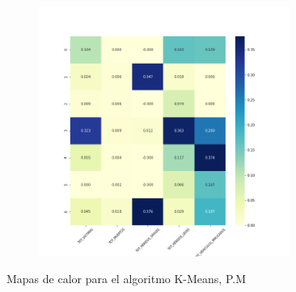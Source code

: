 \begin{figure}[H]
\begin{subfigure}{.5\textwidth}
\end{subfigure}
\begin{subfigure}{.5\textwidth}
  \centering
  \includegraphics[width=0.9\textwidth]{imagenes/case2/kmeans/heatmaps/hm_kmeans_case2_entrada_k7.png}
\end{subfigure}
\caption{Mapas de calor para el algoritmo K-Means, P.M}
\label{fig:hm-km}
\end{figure}

